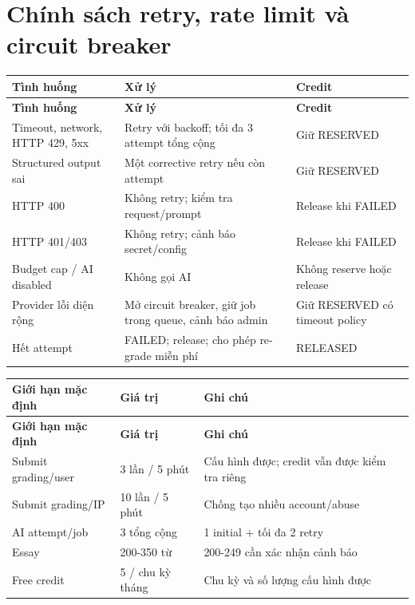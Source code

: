 \documentclass[11pt,a4paper]{article}
\begin{document}
\section{Chính sách retry, rate limit và circuit breaker}
\small
\setlength{\tabcolsep}{4pt}
\renewcommand{\arraystretch}{1.18}
\begin{longtable}{|P{0.27\textwidth}|P{0.49\textwidth}|P{0.16\textwidth}|}
\hline
\textbf{Tình huống} & \textbf{Xử lý} & \textbf{Credit} \\ \hline
\endfirsthead
\hline
\textbf{Tình huống} & \textbf{Xử lý} & \textbf{Credit} \\ \hline
\endhead
Timeout, network, HTTP 429, 5xx & Retry với backoff; tối đa 3 attempt tổng cộng & Giữ RESERVED \\ \hline
Structured output sai & Một corrective retry nếu còn attempt & Giữ RESERVED \\ \hline
HTTP 400 & Không retry; kiểm tra request/\allowbreak{}prompt & Release khi FAILED \\ \hline
HTTP 401/\allowbreak{}403 & Không retry; cảnh báo secret/\allowbreak{}config & Release khi FAILED \\ \hline
Budget cap /\allowbreak{} AI disabled & Không gọi AI & Không reserve hoặc release \\ \hline
Provider lỗi diện rộng & Mở circuit breaker, giữ job trong queue, cảnh báo admin & Giữ RESERVED có timeout policy \\ \hline
Hết attempt & FAILED; release; cho phép re-grade miễn phí & RELEASED \\ \hline
\end{longtable}
\normalsize
\small
\setlength{\tabcolsep}{4pt}
\renewcommand{\arraystretch}{1.18}
\begin{longtable}{|P{0.28\textwidth}|P{0.25\textwidth}|P{0.39\textwidth}|}
\hline
\textbf{Giới hạn mặc định} & \textbf{Giá trị} & \textbf{Ghi chú} \\ \hline
\endfirsthead
\hline
\textbf{Giới hạn mặc định} & \textbf{Giá trị} & \textbf{Ghi chú} \\ \hline
\endhead
Submit grading/\allowbreak{}user & 3 lần /\allowbreak{} 5 phút & Cấu hình được; credit vẫn được kiểm tra riêng \\ \hline
Submit grading/\allowbreak{}IP & 10 lần /\allowbreak{} 5 phút & Chống tạo nhiều account/\allowbreak{}abuse \\ \hline
AI attempt/\allowbreak{}job & 3 tổng cộng & 1 initial + tối đa 2 retry \\ \hline
Essay & 200-350 từ & 200-249 cần xác nhận cảnh báo \\ \hline
Free credit & 5 /\allowbreak{} chu kỳ tháng & Chu kỳ và số lượng cấu hình được \\ \hline
\end{longtable}
\normalsize
\end{document}
